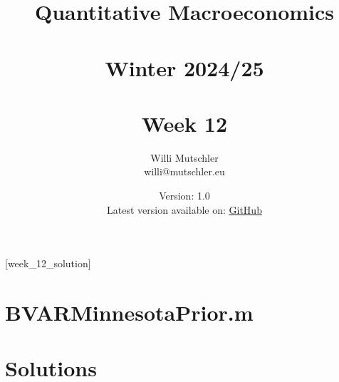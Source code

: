 
\newif\ifDisplaySolutions\DisplaySolutionstrue%


\title{Quantitative Macroeconomics\\~\\Winter 2024/25\\~\\Week 12}
\author{Willi Mutschler\\willi@mutschler.eu}
\date{Version: 1.0\\Latest version available on: \href{https://github.com/wmutschl/Quantitative-Macroeconomics/releases/latest/download/week_12.pdf}{GitHub}}
\maketitle\thispagestyle{empty}

\newpage
{}[week_12_solution]
\tableofcontents\thispagestyle{empty}\newpage

\setcounter{page}{1}
\newpage
\newpage

\printbibliography%
\newpage

\appendix
\section{BVARMinnesotaPrior.m}


\ifDisplaySolutions%
\newpage

\section{Solutions}

\fi
